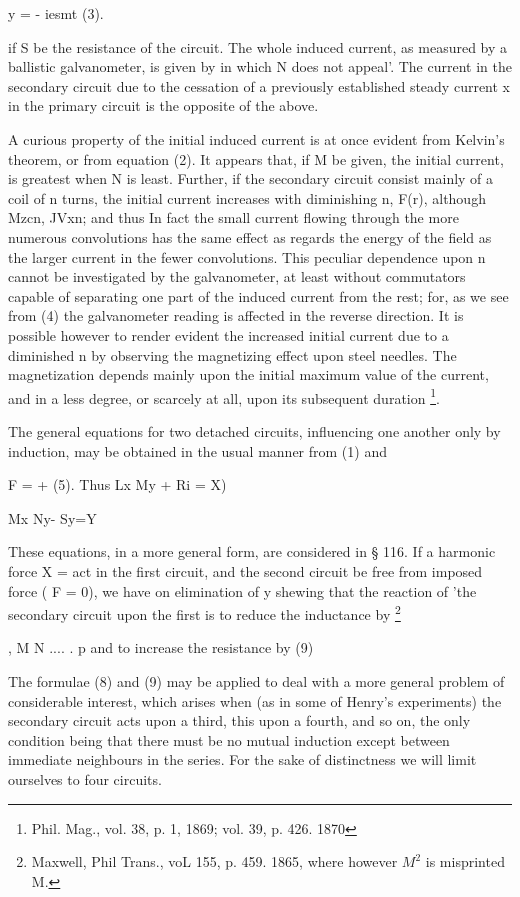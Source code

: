 y = - iesmt (3).

if S be the resistance of the circuit. The whole induced current, as measured
by a ballistic galvanometer, is given by in which N does not appeal'. The
current in the secondary circuit due to the cessation of a previously
established steady current x in the primary circuit is the opposite of the
above.

A curious property of the initial induced current is at once evident from
Kelvin's theorem, or from equation (2). It appears
that, if M be given, the initial current, is greatest when N is least.
Further, if the secondary circuit consist mainly of a coil of n turns, the
initial current increases with diminishing n, F(r), although Mzcn, JVxn; and
thus In fact the small current
flowing through the more numerous convolutions has the same effect as regards
the energy of the field as the larger current in the fewer convolutions. This
peculiar dependence upon n cannot be investigated by the galvanometer, at least
without commutators capable of separating one part of the induced current from
the rest; for, as we see from (4) the galvanometer reading is affected in the
reverse direction. It is possible however to render evident the increased
initial current due to a diminished n by observing the magnetizing effect upon
steel needles. The magnetization depends mainly upon the initial maximum value
of the current, and in a less degree, or scarcely at all, upon its subsequent
duration \footnote{Phil. Mag., vol. 38, p. 1, 1869; vol.  39, p. 426. 1870}.

The general equations for two detached circuits, influencing one
another only by induction, may be obtained in the usual manner from (1) and

F = + (5).  Thus Lx My + Ri = X)

Mx Ny- Sy=Y

These equations, in a more general form, are considered in § 116. If a harmonic
force X = act in the first circuit, and the second circuit be free from imposed
force ( F = 0), we have on elimination of y shewing that the reaction of 'the
secondary circuit upon the first is to reduce the inductance by
\footnote{Maxwell, Phil Trans., voL 155, p. 459. 1865, where however \(M^2\) is
misprinted M.}

, M N .... .  p
and to increase the resistance by (9)

The formulae (8) and (9) may be applied to deal with a more general problem of
considerable interest, which arises when (as in some of Henry’s experiments)
the secondary circuit acts upon a third, this upon a fourth, and so on, the
only condition being that there must be no mutual induction except between
immediate neighbours in the series. For the sake of distinctness we will limit
ourselves to four circuits.

